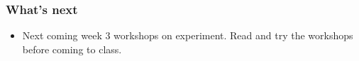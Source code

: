 \documentclass{beamer}
\begin{document}
\begin{frame}
\frametitle{What's next}
	\begin{itemize}
		\item Next coming week 3 workshops on experiment.   Read and try the workshops before coming to class.
	\end{itemize}
\end{frame}

%
%		
%
\end{document}

